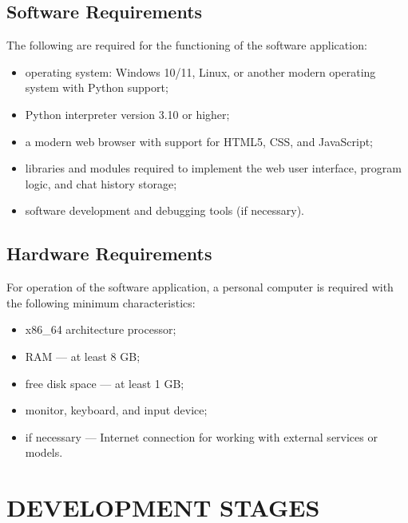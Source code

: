 \documentclass[12pt,a4paper]{article}
\begin{document}
    \subsection{Software Requirements}

    The following are required for the functioning of the software application:

    \begin{itemize}
        \item operating system: Windows 10/11, Linux, or another modern operating system with Python support;
        \item Python interpreter version 3.10 or higher;
        \item a modern web browser with support for HTML5, CSS, and JavaScript;
        \item libraries and modules required to implement the web user interface, program logic, and chat history storage;
        \item software development and debugging tools (if necessary).
    \end{itemize}

    \subsection{Hardware Requirements}

    For operation of the software application, a personal computer is required
    with the following minimum characteristics:

    \begin{itemize}
        \item x86\_64 architecture processor;
        \item RAM --- at least 8 GB;
        \item free disk space --- at least 1 GB;
        \item monitor, keyboard, and input device;
        \item if necessary --- Internet connection for working with external services or models.
    \end{itemize}

    \section{DEVELOPMENT STAGES}
\end{document}
